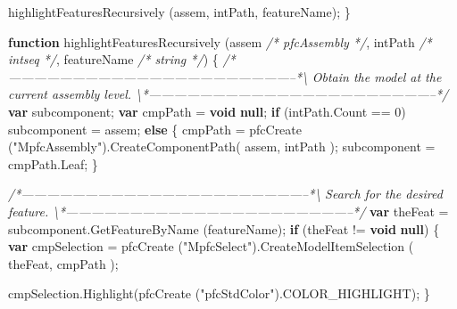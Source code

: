\documentclass[]{article}
\newenvironment{Shaded}{}{}
\newcommand{\KeywordTok}[1]{\textcolor[rgb]{0.00,0.44,0.13}{\textbf{{#1}}}}
\newcommand{\DecValTok}[1]{\textcolor[rgb]{0.25,0.63,0.44}{{#1}}}
\newcommand{\StringTok}[1]{\textcolor[rgb]{0.25,0.44,0.63}{{#1}}}
\newcommand{\CommentTok}[1]{\textcolor[rgb]{0.38,0.63,0.69}{\textit{{#1}}}}
\newcommand{\OtherTok}[1]{\textcolor[rgb]{0.00,0.44,0.13}{{#1}}}
\newcommand{\FunctionTok}[1]{\textcolor[rgb]{0.02,0.16,0.49}{{#1}}}
\newcommand{\NormalTok}[1]{{#1}}
\begin{document}
\begin{Shaded}
\begin{Highlighting}[]
  \FunctionTok{highlightFeaturesRecursively} \NormalTok{(assem, intPath, featureName);}
\NormalTok{\}}

\KeywordTok{function} \FunctionTok{highlightFeaturesRecursively} \NormalTok{(assem }\CommentTok{/* pfcAssembly */}\NormalTok{, }
                       \NormalTok{intPath }\CommentTok{/* intseq */}\NormalTok{,}
                       \NormalTok{featureName }\CommentTok{/* string */}\NormalTok{)}
\NormalTok{\{}
\CommentTok{/*--------------------------------------------------------------------*\textbackslash{} }
\CommentTok{  Obtain the model at the current assembly level.}
\CommentTok{\textbackslash{}*--------------------------------------------------------------------*/}
  \KeywordTok{var} \NormalTok{subcomponent;}
  \KeywordTok{var} \NormalTok{cmpPath = }\KeywordTok{void} \KeywordTok{null}\NormalTok{;}
  \KeywordTok{if} \NormalTok{(}\OtherTok{intPath}\NormalTok{.}\FunctionTok{Count} \NormalTok{== }\DecValTok{0}\NormalTok{)}
    \NormalTok{subcomponent = assem;}
  \KeywordTok{else}
    \NormalTok{\{}
      \NormalTok{cmpPath = }
    \FunctionTok{pfcCreate} \NormalTok{(}\StringTok{"MpfcAssembly"}\NormalTok{).}\FunctionTok{CreateComponentPath}\NormalTok{( assem, intPath );}
      \NormalTok{subcomponent = }\OtherTok{cmpPath}\NormalTok{.}\FunctionTok{Leaf}\NormalTok{; }
    \NormalTok{\}}
   
\CommentTok{/*--------------------------------------------------------------------*\textbackslash{} }
\CommentTok{  Search for the desired feature.}
\CommentTok{\textbackslash{}*--------------------------------------------------------------------*/} 
  \KeywordTok{var} \NormalTok{theFeat = }\OtherTok{subcomponent}\NormalTok{.}\FunctionTok{GetFeatureByName} \NormalTok{(featureName);}
  \KeywordTok{if} \NormalTok{(theFeat != }\KeywordTok{void} \KeywordTok{null}\NormalTok{)}
    \NormalTok{\{}
      \KeywordTok{var} \NormalTok{cmpSelection = }
    \FunctionTok{pfcCreate} \NormalTok{(}\StringTok{"MpfcSelect"}\NormalTok{).}\FunctionTok{CreateModelItemSelection} \NormalTok{( theFeat, cmpPath );}
      
      \OtherTok{cmpSelection}\NormalTok{.}\FunctionTok{Highlight}\NormalTok{(}\FunctionTok{pfcCreate} \NormalTok{(}\StringTok{"pfcStdColor"}\NormalTok{).}\FunctionTok{COLOR_HIGHLIGHT}\NormalTok{);}
    \NormalTok{\}}
  

\end{Highlighting}
\end{Shaded}
\end{document}
